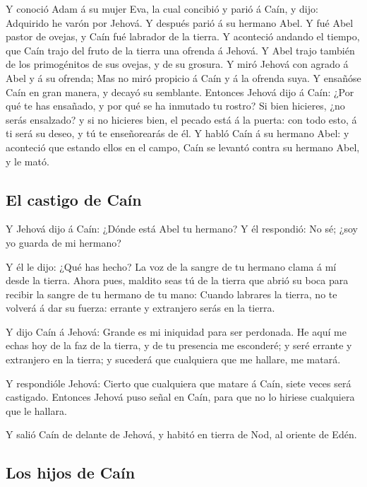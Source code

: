  Y conoció Adam á su mujer Eva, la cual concibió y parió á
Caín, y dijo: Adquirido he varón por Jehová.  Y después
parió á su hermano Abel. Y fué Abel pastor de ovejas, y Caín fué
labrador de la tierra.  Y aconteció andando el tiempo, que
Caín trajo del fruto de la tierra una ofrenda á Jehová.  Y
Abel trajo también de los primogénitos de sus ovejas, y de su grosura. Y
miró Jehová con agrado á Abel y á su ofrenda;  Mas no miró
propicio á Caín y á la ofrenda suya. Y ensañóse Caín en gran manera, y
decayó su semblante.  Entonces Jehová dijo á Caín: ¿Por qué
te has ensañado, y por qué se ha inmutado tu rostro?  Si
bien hicieres, ¿no serás ensalzado? y si no hicieres bien, el pecado
está á la puerta: con todo esto, á ti será su deseo, y tú te
enseñorearás de él.  Y habló Caín á su hermano Abel: y
aconteció que estando ellos en el campo, Caín se levantó contra su
hermano Abel, y le mató.

\hypertarget{el-castigo-de-cauxedn}{%
\subsection{El castigo de Caín}\label{el-castigo-de-cauxedn}}

 Y Jehová dijo á Caín: ¿Dónde está Abel tu hermano? Y él
respondió: No sé; ¿soy yo guarda de mi hermano?

 Y él le dijo: ¿Qué has hecho? La voz de la sangre de tu
hermano clama á mí desde la tierra.  Ahora pues, maldito
seas tú de la tierra que abrió su boca para recibir la sangre de tu
hermano de tu mano:  Cuando labrares la tierra, no te
volverá á dar su fuerza: errante y extranjero serás en la tierra.

 Y dijo Caín á Jehová: Grande es mi iniquidad para ser
perdonada.  He aquí me echas hoy de la faz de la tierra, y
de tu presencia me esconderé; y seré errante y extranjero en la tierra;
y sucederá que cualquiera que me hallare, me matará.

 Y respondióle Jehová: Cierto que cualquiera que matare á
Caín, siete veces será castigado. Entonces Jehová puso señal en Caín,
para que no lo hiriese cualquiera que le hallara.

 Y salió Caín de delante de Jehová, y habitó en tierra de
Nod, al oriente de Edén.

\hypertarget{los-hijos-de-cauxedn}{%
\subsection{Los hijos de Caín}\label{los-hijos-de-cauxedn}}

